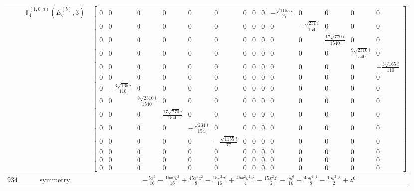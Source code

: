 \documentclass[fleqn,8pt,landscape]{jsarticle}
\begin{document}
\begin{longtable}{ccc}
$  $ & $ \mathbb{T}_{4}^{(1,0;a)}(E_{g}^{(b)},3) $ & $ \begin{bmatrix} 0 & 0 & 0 & 0 & 0 & 0 & 0 & 0 & 0 & - \frac{\sqrt{1155} i}{77} & 0 & 0 & 0 & 0 \\ 0 & 0 & 0 & 0 & 0 & 0 & 0 & 0 & 0 & 0 & - \frac{\sqrt{231} i}{154} & 0 & 0 & 0 \\ 0 & 0 & 0 & 0 & 0 & 0 & 0 & 0 & 0 & 0 & 0 & \frac{17 \sqrt{770} i}{1540} & 0 & 0 \\ 0 & 0 & 0 & 0 & 0 & 0 & 0 & 0 & 0 & 0 & 0 & 0 & \frac{9 \sqrt{2310} i}{1540} & 0 \\ 0 & 0 & 0 & 0 & 0 & 0 & 0 & 0 & 0 & 0 & 0 & 0 & 0 & - \frac{3 \sqrt{165} i}{110} \\ 0 & 0 & 0 & 0 & 0 & 0 & 0 & 0 & 0 & 0 & 0 & 0 & 0 & 0 \\ 0 & - \frac{3 \sqrt{165} i}{110} & 0 & 0 & 0 & 0 & 0 & 0 & 0 & 0 & 0 & 0 & 0 & 0 \\ 0 & 0 & \frac{9 \sqrt{2310} i}{1540} & 0 & 0 & 0 & 0 & 0 & 0 & 0 & 0 & 0 & 0 & 0 \\ 0 & 0 & 0 & \frac{17 \sqrt{770} i}{1540} & 0 & 0 & 0 & 0 & 0 & 0 & 0 & 0 & 0 & 0 \\ 0 & 0 & 0 & 0 & - \frac{\sqrt{231} i}{154} & 0 & 0 & 0 & 0 & 0 & 0 & 0 & 0 & 0 \\ 0 & 0 & 0 & 0 & 0 & - \frac{\sqrt{1155} i}{77} & 0 & 0 & 0 & 0 & 0 & 0 & 0 & 0 \\ 0 & 0 & 0 & 0 & 0 & 0 & 0 & 0 & 0 & 0 & 0 & 0 & 0 & 0 \\ 0 & 0 & 0 & 0 & 0 & 0 & 0 & 0 & 0 & 0 & 0 & 0 & 0 & 0 \\ 0 & 0 & 0 & 0 & 0 & 0 & 0 & 0 & 0 & 0 & 0 & 0 & 0 & 0 \end{bmatrix} $ \\ \hline
$ 934 $ & $ \text{symmetry} $ & $ - \frac{5 x^{6}}{16} - \frac{15 x^{4} y^{2}}{16} + \frac{45 x^{4} z^{2}}{8} - \frac{15 x^{2} y^{4}}{16} + \frac{45 x^{2} y^{2} z^{2}}{4} - \frac{15 x^{2} z^{4}}{2} - \frac{5 y^{6}}{16} + \frac{45 y^{4} z^{2}}{8} - \frac{15 y^{2} z^{4}}{2} + z^{6} $ \\

\end{longtable}
\end{document}
